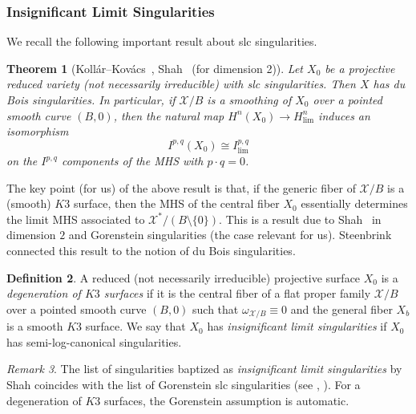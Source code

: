 \documentclass[11pt]{amsart}
\numberwithin{equation}{section}
\theoremstyle{plain}
\newtheorem{theorem}{Theorem}[section]
\theoremstyle{remark}
\newtheorem{remark}[theorem]{Remark}
\theoremstyle{definition}
\newtheorem{definition}[theorem]{Definition}
\newcommand{\sX}{\mathscr{X}}
\begin{document}
\subsubsection{Insignificant Limit Singularities} 
%
We recall the following important result about slc singularities.

\begin{theorem}[{Koll\'ar--Kov\'acs~\cite{kk}, Shah~\cite{shahinsignificant} (for dimension 2)}]\label{thm:dubois}
%
Let $X_0$ be a projective reduced variety (not necessarily irreducible)  with slc singularities. Then $X$ has du Bois singularities. In particular, if $\sX/B$ is a smoothing of $X_0$ over a pointed smooth curve $(B,0)$, then the natural map $H^n(X_0)\to H^n_{\lim}$
%
induces an isomorphism
%
$$I^{p,q}(X_0)\cong I^{p,q}_{\lim}$$
%
on the $I^{p,q}$ components of the MHS with $p\cdot q=0$. 
%
\end{theorem}
%
The key point (for us) of the above result  is that, if the generic fiber of $\sX/B$ is a (smooth) $K3$ surface, then the MHS of the central fiber $X_0$  essentially determines the limit MHS associated to $\sX^*/(B\setminus\{0\})$. This is a result due to Shah~\cite{shahinsignificant} in dimension $2$ and Gorenstein singularities (the case relevant for us). Steenbrink~\cite{steenbrinkinsignificant}
connected this result to the notion of du Bois singularities. 
%
 \begin{definition}
%
A reduced  (not necessarily irreducible)  projective surface $X_0$ is a \emph{degeneration of $K3$ surfaces} if it is the central fiber of a flat proper family $\sX/B$ over a pointed smooth curve $(B,0)$  such that $\omega_{\sX/B}\equiv 0$ and the general fiber $X_b$ is a smooth $K3$ surface. 
 We say that $X_0$ has \emph{insignificant limit singularities} if $X_0$ has semi-log-canonical singularities.
 \end{definition}
 
 \begin{remark}
%
 The list of singularities baptized as \emph{insignificant limit singularities} by Shah \cite{shahinsignificant} coincides with the list of Gorenstein slc singularities (see \cite{sbnef}, \cite{ksb}). For a degeneration of $K3$ surfaces, the Gorenstein assumption is automatic. 
 \end{remark}
\end{document}

